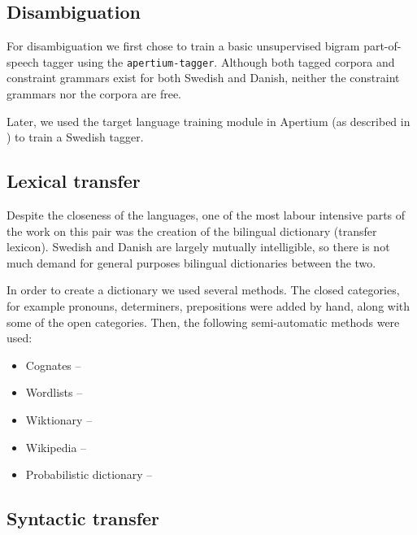 \documentclass[11pt]{article}
\begin{document}
\subsection{Disambiguation}


For disambiguation we first chose to train a basic unsupervised bigram part-of-speech tagger
using the {\tt\small apertium-tagger}. Although both tagged corpora and constraint
grammars exist for both Swedish and Danish, neither the constraint grammars
nor the corpora are free.

Later, we used the target language training module in Apertium (as described in \cite{sanchez2008})
to train a Swedish tagger.

\subsection{Lexical transfer}

Despite the closeness of the languages, one of the most labour intensive parts of 
the work on this pair was the creation of the bilingual dictionary (transfer 
lexicon). Swedish and Danish are largely mutually intelligible, so there is not 
much demand for general purposes bilingual dictionaries between the two.

In order to create a dictionary we used several methods. The closed categories, 
for example pronouns, determiners, prepositions were added by hand, along with some 
of the open categories. Then, the following semi-automatic methods were used:

\begin{itemize} 
  \item Cognates --
  \item Wordlists --
  \item Wiktionary --
  \item Wikipedia -- 
  \item Probabilistic dictionary --
\end{itemize}

\subsection{Syntactic transfer}

\end{document}
